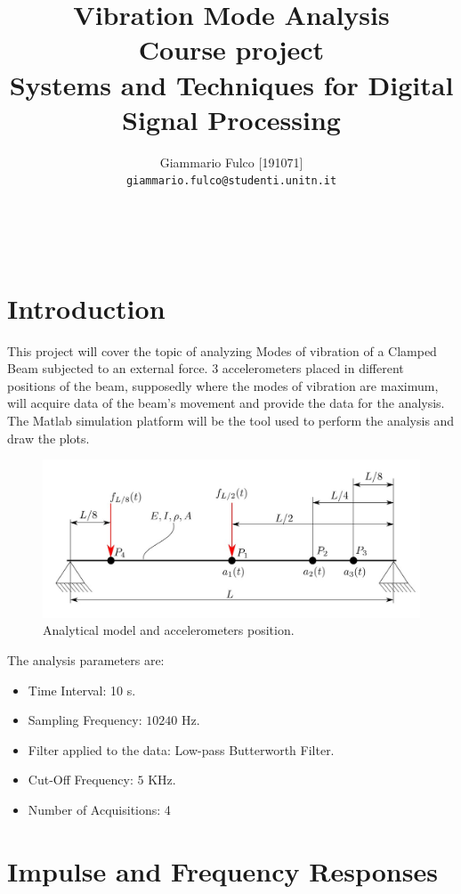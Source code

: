 \documentclass[12pt,a4paper,twoside]{article}
\author{Giammario Fulco [191071]\\
\texttt{giammario.fulco@studenti.unitn.it}}
\title{\textbf{Vibration Mode Analysis}\\
	Course project\\
	Systems and Techniques for Digital Signal Processing\\}
\begin{document}
\vspace{-1em}
\maketitle
\vspace{-2em}
\tableofcontents
\thispagestyle{empty}
\afterpage{\pagestyle{empty}}
\thispagestyle{empty}
~
\clearpage
\setcounter{page}{1}
%
\section{Introduction}
This project will cover the topic of analyzing Modes of vibration of a Clamped Beam subjected to an external force. 3 accelerometers placed in different positions of the beam, supposedly where the modes of vibration are maximum, will acquire data of the beam's movement and provide the data for the analysis. The Matlab simulation platform will be the tool used to perform the analysis and draw the plots.\\

\begin{figure}[h!]
	\centering
	\includegraphics[width=0.9\linewidth]{Images/beam.jpg}
	\caption{Analytical model and accelerometers position.}
	\label{beam}
\end{figure}
\noindent

The analysis parameters are:
\begin{itemize}
	\item Time Interval: 10 s.
	\item Sampling Frequency: $10240$ Hz.
	\item Filter applied to the data: Low-pass Butterworth Filter.
	\item Cut-Off Frequency: $5$ KHz.
	\item Number of Acquisitions: 4
\end{itemize}
\bigskip \bigskip \bigskip \bigskip \bigskip \bigskip
\bigskip
\bigskip
\bigskip
\section{Impulse and Frequency Responses}
\end{document}

